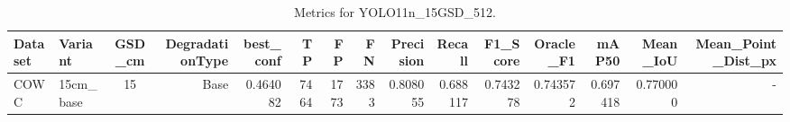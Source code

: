 \begin{table}
\caption{Metrics for YOLO11n_15GSD_512.}
\label{tab:rq1_results}
\begin{tabular}{llcrrrrrrrrrrrr}
\toprule
Dataset & Variant & GSD_cm & DegradationType & best_conf & TP & FP & FN & Precision & Recall & F1_Score & Oracle_F1 & mAP50 & Mean_IoU & Mean_Point_Dist_px \\
\midrule
COWC & 15cm_base & 15 & Base & 0.464082 & 7464 & 1773 & 3383 & 0.808055 & 0.688117 & 0.743278 & 0.743572 & 0.697418 & 0.770000 & - \\
\bottomrule
\end{tabular}
\end{table}
